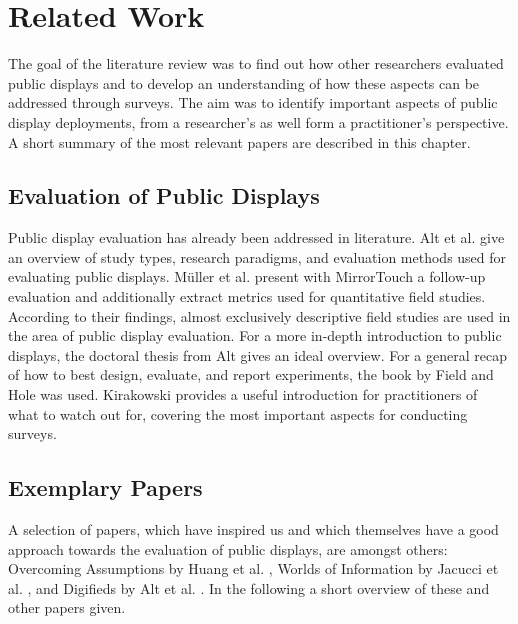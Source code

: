 \section{Related Work}
\label{chapter:related-work}

	The goal of the literature review was to find out how other researchers evaluated public displays and to develop an understanding of how these aspects can be addressed through surveys. The aim was to identify important aspects of public display deployments, from a researcher's as well form a practitioner's perspective. A short summary of the most relevant papers are described in this chapter.


	\subsection{Evaluation of Public Displays} %

	Public display evaluation has already been addressed in literature. Alt et al. \cite{Alt2012HowToEvaluate} give an overview of study types, research paradigms, and evaluation methods used for evaluating public displays. M{\"u}ller et al. \cite{muller2014mirrortouch} present with MirrorTouch a follow-up evaluation and additionally extract metrics used for quantitative field studies. According to their findings, almost exclusively descriptive field studies are used in the area of public display evaluation. For a more in-depth introduction to public displays, the doctoral thesis from Alt \cite{alt2013thesis} gives an ideal overview.
	For a general recap of how to best design, evaluate, and report experiments, the book by Field and Hole \cite{field2003design} was used. Kirakowski \cite{kirakowski2000questionnaireFAQ} provides a useful introduction for practitioners of what to watch out for, covering the most important aspects for conducting surveys.




	\subsection{Exemplary Papers}

	A selection of papers, which have inspired us and which themselves have a good approach towards the evaluation of public displays, are amongst others: Overcoming Assumptions by Huang et al. \cite{huang2008overcoming}, Worlds of Information by Jacucci et al. \cite{jacucci2010worldsofinformation}, and Digifieds by Alt et al. \cite{alt2011digifieds}. In the following a short overview of these and other papers given.


